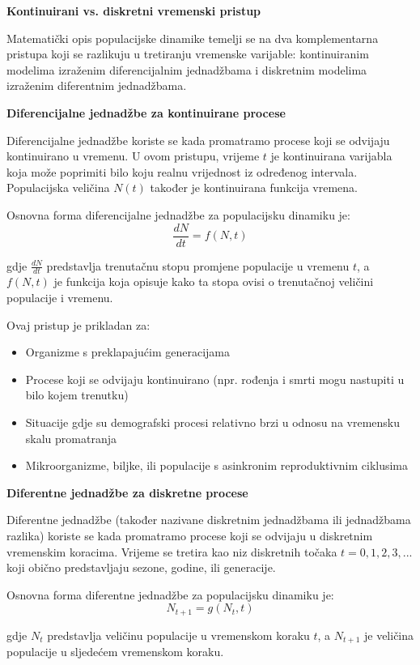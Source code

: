 \documentclass[11pt,oneside]{book}
\begin{document}
\textbf{Kontinuirani vs. diskretni vremenski pristup}

Matematički opis populacijske dinamike temelji se na dva komplementarna pristupa koji se razlikuju u tretiranju vremenske varijable: kontinuiranim modelima izraženim diferencijalnim jednadžbama i diskretnim modelima izraženim diferentnim jednadžbama.

\textbf{Diferencijalne jednadžbe za kontinuirane procese}

Diferencijalne jednadžbe koriste se kada promatramo procese koji se odvijaju kontinuirano u vremenu. U ovom pristupu, vrijeme $t$ je kontinuirana varijabla koja može poprimiti bilo koju realnu vrijednost iz određenog intervala. Populacijska veličina $N(t)$ također je kontinuirana funkcija vremena.

Osnovna forma diferencijalne jednadžbe za populacijsku dinamiku je:
$$\frac{dN}{dt} = f(N,t)$$

gdje $\frac{dN}{dt}$ predstavlja trenutačnu stopu promjene populacije u vremenu $t$, a $f(N,t)$ je funkcija koja opisuje kako ta stopa ovisi o trenutačnoj veličini populacije i vremenu.

Ovaj pristup je prikladan za:
\begin{itemize}
	\item Organizme s preklapajućim generacijama
	\item Procese koji se odvijaju kontinuirano (npr. rođenja i smrti mogu nastupiti u bilo kojem trenutku)
	\item Situacije gdje su demografski procesi relativno brzi u odnosu na vremensku skalu promatranja
	\item Mikroorganizme, biljke, ili populacije s asinkronim reproduktivnim ciklusima
\end{itemize}

\textbf{Diferentne jednadžbe za diskretne procese}

Diferentne jednadžbe (također nazivane diskretnim jednadžbama ili jednadžbama razlika) koriste se kada promatramo procese koji se odvijaju u diskretnim vremenskim koracima. Vrijeme se tretira kao niz diskretnih točaka $t = 0, 1, 2, 3, ...$ koji obično predstavljaju sezone, godine, ili generacije.

Osnovna forma diferentne jednadžbe za populacijsku dinamiku je:
$$N_{t+1} = g(N_t, t)$$

gdje $N_t$ predstavlja veličinu populacije u vremenskom koraku $t$, a $N_{t+1}$ je veličina populacije u sljedećem vremenskom koraku.
\end{document}
